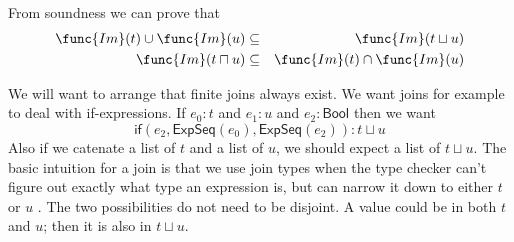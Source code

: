 \documentclass[12pt]{article}
\begin{document}
From soundness we can prove that%
\begin{eqnarray*}
\func{Im}(t)\cup \func{Im}(u) &\subseteq &\func{Im}(t\sqcup u) \\
\func{Im}(t\sqcap u) &\subseteq &\func{Im}(t)\cap \func{Im}(u)
\end{eqnarray*}

We will want to arrange that finite joins always exist. We want joins for
example to deal with if-expressions. If $e_{0}:t$ and $e_{1}:u$ and $e_{2}:%
\mathsf{Bool}$ then we want%
\begin{equation*}
\mathsf{if}(e_{2},\mathsf{ExpSeq}(e_{0}),\mathsf{ExpSeq}(e_{2})):t\sqcup u
\end{equation*}%
Also if we catenate a list of $t$ and a list of $u$, we should expect a list
of $t\sqcup u$. The basic intuition for a join is that we use join types
when the type checker can't figure out exactly what type an expression is,
but can narrow it down to either $t$ or $u$ . The two possibilities do not
need to be disjoint. A value could be in both $t$ and $u$; then it is also
in $t\sqcup u$.
\end{document}

